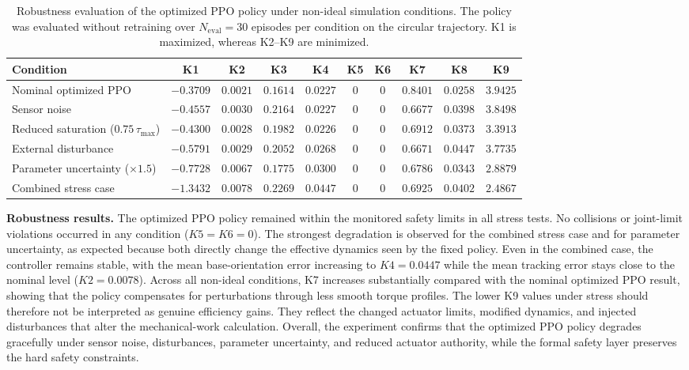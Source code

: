 \documentclass{ieeeaccess}
\begin{document}
\begin{table}[!t]
    \centering
    \caption{Robustness evaluation of the optimized PPO policy under non-ideal simulation conditions.
    The policy was evaluated without retraining over $N_{\mathrm{eval}}=30$ episodes per condition on the circular
    trajectory. K1 is maximized, whereas K2--K9 are minimized.}
    \label{tab:robustness_eval}
    \small
    \renewcommand{\arraystretch}{1.15}
    \setlength{\tabcolsep}{3pt}
    \begin{tabular}{lccccccccc}
        \toprule
        \textbf{Condition} & \textbf{K1} & \textbf{K2} & \textbf{K3} & \textbf{K4} & \textbf{K5} & \textbf{K6} & \textbf{K7} & \textbf{K8} & \textbf{K9} \\
        \midrule
        Nominal optimized PPO & $-0.3709$ & $0.0021$ & $0.1614$ & $0.0227$ & $0$ & $0$ & $0.8401$ & $0.0258$ & $3.9425$ \\
        Sensor noise & $-0.4557$ & $0.0030$ & $0.2164$ & $0.0227$ & $0$ & $0$ & $0.6677$ & $0.0398$ & $3.8498$ \\
        Reduced saturation ($0.75\,\tau_{\max}$) & $-0.4300$ & $0.0028$ & $0.1982$ & $0.0226$ & $0$ & $0$ & $0.6912$ & $0.0373$ & $3.3913$ \\
        External disturbance & $-0.5791$ & $0.0029$ & $0.2052$ & $0.0268$ & $0$ & $0$ & $0.6671$ & $0.0447$ & $3.7735$ \\
        Parameter uncertainty ($\times 1.5$) & $-0.7728$ & $0.0067$ & $0.1775$ & $0.0300$ & $0$ & $0$ & $0.6786$ & $0.0343$ & $2.8879$ \\
        Combined stress case & $-1.3432$ & $0.0078$ & $0.2269$ & $0.0447$ & $0$ & $0$ & $0.6925$ & $0.0402$ & $2.4867$ \\
        \bottomrule
    \end{tabular}
\end{table}

\noindent\textbf{Robustness results.} The optimized PPO policy remained within the monitored safety limits in all
stress tests. No collisions
or joint-limit violations occurred in any condition ($K5=K6=0$). The strongest degradation is observed for
the
combined stress case and for parameter uncertainty, as expected because both directly change the
effective dynamics
seen by the fixed policy. Even in the combined case, the controller remains stable,
with the mean base-orientation
error increasing to $K4=0.0447$ while the mean tracking error stays close to the nominal
level ($K2=0.0078$).
Across all non-ideal conditions, K7 increases substantially compared with the nominal optimized PPO result,
showing
that the policy compensates for perturbations through less smooth torque profiles. The lower K9
values under stress
should therefore not be interpreted as genuine efficiency gains. They reflect the changed actuator
limits, modified
dynamics, and injected disturbances that alter the mechanical-work calculation. Overall, the experiment confirms
that the optimized PPO policy degrades gracefully under sensor noise, disturbances, parameter uncertainty, and
reduced actuator authority, while the formal safety layer preserves the hard safety constraints.
\end{document}
